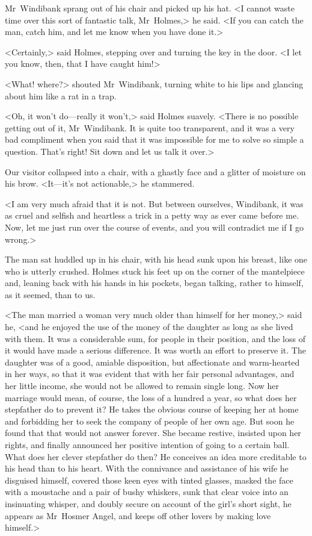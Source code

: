 Mr~Windibank sprang out of his chair and picked up his hat. <I cannot waste time over this sort of fantastic talk, Mr~Holmes,> he said. <If you can catch the man, catch him, and let me know when you have done it.>

<Certainly,> said Holmes, stepping over and turning the key in the door. <I let you know, then, that I have caught him!>

<What! where?> shouted Mr~Windibank, turning white to his lips and glancing about him like a rat in a trap.

<Oh, it won't do—really it won't,> said Holmes suavely. <There is no possible getting out of it, Mr~Windibank. It is quite too transparent, and it was a very bad compliment when you said that it was impossible for me to solve so simple a question. That's right! Sit down and let us talk it over.>

Our visitor collapsed into a chair, with a ghastly face and a glitter of moisture on his brow. <It—it's not actionable,> he stammered.

<I am very much afraid that it is not. But between ourselves, Windibank, it was as cruel and selfish and heartless a trick in a petty way as ever came before me. Now, let me just run over the course of events, and you will contradict me if I go wrong.>

The man sat huddled up in his chair, with his head sunk upon his breast, like one who is utterly crushed. Holmes stuck his feet up on the corner of the mantelpiece and, leaning back with his hands in his pockets, began talking, rather to himself, as it seemed, than to us.

<The man married a woman very much older than himself for her money,> said he, <and he enjoyed the use of the money of the daughter as long as she lived with them. It was a considerable sum, for people in their position, and the loss of it would have made a serious difference. It was worth an effort to preserve it. The daughter was of a good, amiable disposition, but affectionate and warm-hearted in her ways, so that it was evident that with her fair personal advantages, and her little income, she would not be allowed to remain single long. Now her marriage would mean, of course, the loss of a hundred a year, so what does her stepfather do to prevent it? He takes the obvious course of keeping her at home and forbidding her to seek the company of people of her own age. But soon he found that that would not answer forever. She became restive, insisted upon her rights, and finally announced her positive intention of going to a certain ball. What does her clever stepfather do then? He conceives an idea more creditable to his head than to his heart. With the connivance and assistance of his wife he disguised himself, covered those keen eyes with tinted glasses, masked the face with a moustache and a pair of bushy whiskers, sunk that clear voice into an insinuating whisper, and doubly secure on account of the girl's short sight, he appears as Mr~Hosmer Angel, and keeps off other lovers by making love himself.>

